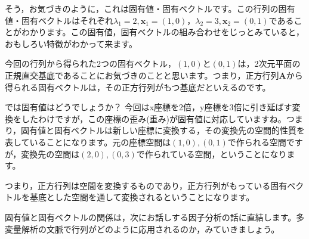 \documentclass{ltjsbook}
\begin{document}
そう，お気づきのように，これは固有値・固有ベクトルです。この行列の固有値・固有ベクトルはそれぞれ$\lambda_1=2,\bm{x}_1=(1,0)$，$\lambda_2=3,\bm{x}_2=(0,1)$であることがわかります。この固有値，固有ベクトルの組み合わせをじっとみていると，おもしろい特徴がわかって来ます。

今回の行列から得られた2つの固有ベクトル，$(1,0)$と$(0,1)$は，2次元平面の正規直交基底であることにお気づきのことと思います。つまり，正方行列$\bm{A}$から得られる固有ベクトルは，その正方行列がもつ基底だといえるのです。

では固有値はどうでしょうか？ 今回はx座標を2倍，y座標を3倍に引き延ばす変換をしたわけですが，この座標の歪み(重み)が固有値に対応していますね。つまり，固有値と固有ベクトルは新しい座標に変換する，その変換先の空間的性質を表していることになります。元の座標空間は$(1,0),(0,1)$で作られる空間ですが，変換先の空間は$(2,0),(0,3)$で作られている空間，ということになります。

つまり，正方行列は空間を変換するものであり，正方行列がもっている固有ベクトルを基底とした空間を通して変換されるということになります。


\vspace{2cm}
固有値と固有ベクトルの関係は，次にお話しする因子分析の話に直結します。多変量解析の文脈で行列がどのように応用されるのか，みていきましょう。
\end{document}
